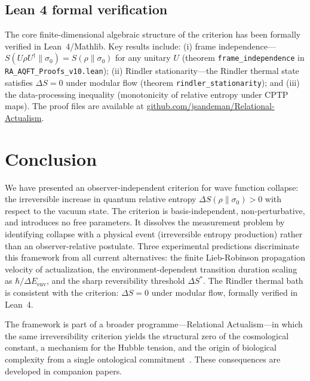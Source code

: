 \documentclass[11pt,twocolumn]{article}
\begin{document}
\subsection{Lean 4 formal verification}

The core finite-dimensional algebraic structure of the criterion
has been formally verified in Lean~4/Mathlib.
Key results include: (i) frame independence---$S(U\rho U^\dagger\|\sigma_0)
= S(\rho\|\sigma_0)$ for any unitary $U$ (theorem
\texttt{frame\_independence} in \texttt{RA\_AQFT\_Proofs\_v10.lean});
(ii) Rindler stationarity---the Rindler thermal state satisfies
$\Delta S = 0$ under modular flow (theorem
\texttt{rindler\_stationarity}); and (iii) the data-processing
inequality (monotonicity of relative entropy under CPTP maps).
The proof files are available at
\href{https://github.com/jsandeman/Relational-Actualism}{github.com/jsandeman/Relational-Actualism}.

\section{Conclusion}
\label{sec:conclusion}

We have presented an observer-independent criterion for wave function
collapse: the irreversible increase in quantum relative entropy
$\Delta S(\rho\|\sigma_0) > 0$ with respect to the vacuum state.
The criterion is basis-independent, non-perturbative, and introduces
no free parameters.
It dissolves the measurement problem by identifying collapse with
a physical event (irreversible entropy production) rather than an
observer-relative postulate.
Three experimental predictions discriminate this framework from all
current alternatives: the finite Lieb-Robinson propagation velocity
of actualization, the environment-dependent transition duration
scaling as $\hbar/\Delta E_{\mathrm{env}}$, and the sharp
reversibility threshold $\Delta S^*$.
The Rindler thermal bath is consistent with the criterion:
$\Delta S = 0$ under modular flow, formally verified in Lean~4.

The framework is part of a broader programme---Relational
Actualism---in which the same irreversibility criterion yields
the structural zero of the cosmological constant, a mechanism
for the Hubble tension, and the origin of biological complexity
from a single ontological commitment~\cite{Sandeman2026P3,Sandeman2026P4}.
These consequences are developed in companion papers.
\end{document}
